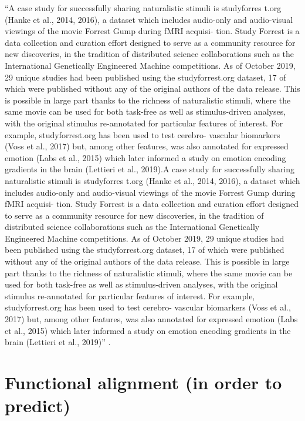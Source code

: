 ``A case study for successfully sharing naturalistic stimuli is studyforres t.org
(Hanke et al., 2014, 2016), a dataset which includes audio-only and audio-visual
viewings of the movie Forrest Gump during fMRI acquisi- tion. Study Forrest is a
data collection and curation effort designed to serve as a community resource
for new discoveries, in the tradition of distributed science collaborations such
as the International Genetically Engineered Machine competitions. As of October
2019, 29 unique studies had been published using the studyforrest.org dataset,
17 of which were published without any of the original authors of the data
release. This is possible in large part thanks to the richness of naturalistic
stimuli, where the same movie can be used for both task-free as well as
stimulus-driven analyses, with the original stimulus re-annotated for particular
features of interest. For example, studyforrest.org has been used to test
cerebro- vascular biomarkers (Voss et al., 2017) but, among other features, was
also annotated for expressed emotion (Labs et al., 2015) which later informed a
study on emotion encoding gradients in the brain (Lettieri et al., 2019).A case
study for successfully sharing naturalistic stimuli is studyforres t.org (Hanke
et al., 2014, 2016), a dataset which includes audio-only and audio-visual
viewings of the movie Forrest Gump during fMRI acquisi- tion. Study Forrest is a
data collection and curation effort designed to serve as a community resource
for new discoveries, in the tradition of distributed science collaborations such
as the International Genetically Engineered Machine competitions. As of October
2019, 29 unique studies had been published using the studyforrest.org dataset,
17 of which were published without any of the original authors of the data
release. This is possible in large part thanks to the richness of naturalistic
stimuli, where the same movie can be used for both task-free as well as
stimulus-driven analyses, with the original stimulus re-annotated for particular
features of interest. For example, studyforrest.org has been used to test
cerebro- vascular biomarkers (Voss et al., 2017) but, among other features, was
also annotated for expressed emotion (Labs et al., 2015) which later informed a
study on emotion encoding gradients in the brain (Lettieri et al., 2019)''
\citep{dupre2020nature}.


\section{Functional alignment (in order to predict)}


